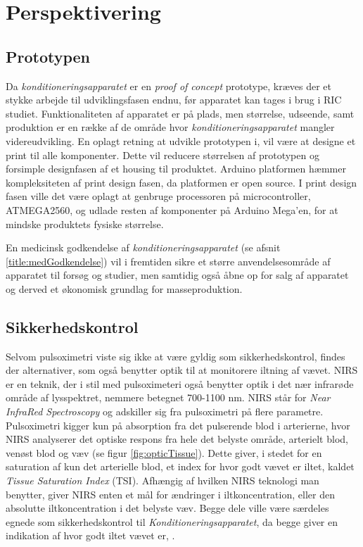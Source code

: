 \chapter{Perspektivering} 

\section{Prototypen}
Da \textit{konditioneringsapparatet} er en \textit{proof of concept} prototype, kræves der et stykke arbejde til udviklingsfasen endnu, før apparatet kan tages i brug i RIC studiet. Funktionaliteten af apparatet er på plads, men størrelse, udseende, samt produktion er en række af de område hvor \textit{konditioneringsapparatet} mangler videreudvikling. En oplagt retning at udvikle prototypen i, vil være at designe et print til alle komponenter. Dette vil reducere størrelsen af prototypen og forsimple designfasen af et housing til produktet. Arduino platformen hæmmer kompleksiteten af print design fasen, da platformen er open source. I print design fasen ville det være oplagt at genbruge processoren på microcontroller, ATMEGA2560, og udlade resten af komponenter på Arduino Mega'en, for at mindske produktets fysiske størrelse. 

En medicinsk godkendelse af \textit{konditioneringsapparatet} (se afsnit \ref{title:medGodkendelse}) vil i fremtiden sikre et større anvendelsesområde af apparatet til forsøg og studier, men samtidig også åbne op for salg af apparatet og derved et økonomisk grundlag for masseproduktion.

\section{Sikkerhedskontrol}\label{title:nirs}
Selvom pulsoximetri viste sig ikke at være gyldig som sikkerhedskontrol, findes der alternativer, som også benytter optik til at monitorere iltning af vævet. NIRS er en teknik, der i stil med pulsoximeteri også benytter optik i det nær infrarøde område af lysspektret, nemmere betegnet 700-1100 nm. NIRS står for \textit{Near InfraRed Spectroscopy} og adskiller sig fra pulsoximetri på flere parametre. Pulsoximetri kigger kun på absorption fra det pulserende blod i arterierne, hvor NIRS analyserer det optiske respons fra hele det belyste område, arterielt blod, venøst blod og væv (se figur \ref{fig:opticTissue}). Dette giver, i stedet for en saturation af kun det arterielle blod, et index for hvor godt vævet er iltet, kaldet \textit{Tissue Saturation Index} (TSI). Afhængig af hvilken NIRS teknologi man benytter, giver NIRS enten et mål for ændringer i iltkoncentration, eller den absolutte iltkoncentration i det belyste væv. Begge dele ville være særdeles egnede som sikkerhedskontrol til \textit{Konditioneringsapparatet}, da begge giver en indikation af hvor godt iltet vævet er, \cite{RefWorks:22} .

